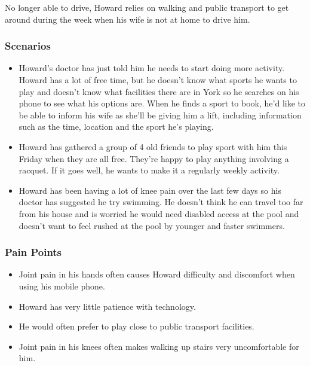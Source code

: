 No longer able to drive, Howard relies on walking and public transport to get
around during the week when his wife is not at home to drive him.


\subsubsection*{Scenarios}
\label{ssub:eldery_scenarios}

\begin{itemize}
	\item Howard's doctor has just told him he needs to start doing more
		activity. Howard has a lot of free time, but he doesn't know what
		sports he wants to play and doesn't know what facilities there are in
		York so he searches on his phone to see what his options are. When he
		finds a sport to book, he'd like to be able to inform his wife as
		she'll be giving him a lift, including information such as the time,
		location and the sport he's playing.

	\item Howard has gathered a group of 4 old friends to play sport with him
		this Friday when they are all free. They're happy to play anything
		involving a racquet. If it goes well, he wants to make it a regularly
		weekly activity.

	\item Howard has been having a lot of knee pain over the last few days so
		his doctor has suggested he try swimming. He doesn't think he can
		travel too far from his house and is worried he would need disabled
		access at the pool and doesn't want to feel rushed at the pool by
		younger and faster swimmers.
\end{itemize}


\subsubsection*{Pain Points}
\label{ssub:eldery_pain_points}

\begin{itemize}
	\item Joint pain in his hands often causes Howard difficulty and discomfort
		when using his mobile phone.
	\item Howard has very little patience with technology.
	\item He would often prefer to play close to public transport facilities.
	\item Joint pain in his knees often makes walking up stairs very
		uncomfortable for him.
\end{itemize}

